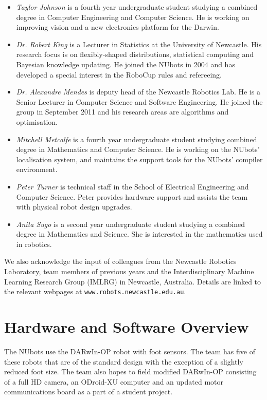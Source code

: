 \documentclass{llncs}
\begin{document}
\begin{itemize}
\item \emph{Taylor Johnson} is a fourth year undergraduate student studying a combined degree in Computer Engineering and Computer Science. He is working on improving vision and a new electronics platform for the Darwin.

\item \emph{Dr. Robert King} is a Lecturer in Statistics at the University of Newcastle. His research focus is on flexibly-shaped distributions,
statistical computing and Bayesian knowledge updating. He joined the
NUbots in 2004 and has developed a special interest in the RoboCup rules and refereeing.

\item \emph{Dr. Alexandre Mendes} is deputy head of the Newcastle Robotics Lab. He is a Senior Lecturer in Computer Science and Software Engineering. He joined the group in September 2011 and his research areas are algorithms and optimisation.

\item \emph{Mitchell Metcalfe} is a fourth year undergraduate student studying combined degree in Mathematics and Computer Science. He is working on the NUbots' localisation system, and maintains the support tools for the NUbots' compiler environment.

\item \emph{Peter Turner} is technical staff in the School of Electrical Engineering and Computer Science. Peter provides hardware support and assists the team with physical robot design upgrades. %

\item \emph{Anita Sugo} is a second year undergraduate student studying a combined degree in Mathematics and Science. She is interested in the mathematics used in robotics.

\end{itemize}

We also acknowledge the input of colleagues from the Newcastle Robotics Laboratory, team members of previous years
and the Interdisciplinary Machine Learning Research Group (IMLRG) in
Newcastle, Australia. Details are linked to the relevant webpages at
\texttt{www.robots.newcastle.edu.au}. %


\section{Hardware and Software Overview}
The NUbots use the DARwIn-OP robot with foot sensors. The team has five of these robots that are of the standard design with the exception of a slightly reduced foot size. The team also hopes to field modified DARwIn-OP consisting of a full HD camera, an ODroid-XU computer and an updated motor communications board as a part of a student project. %
\end{document}
